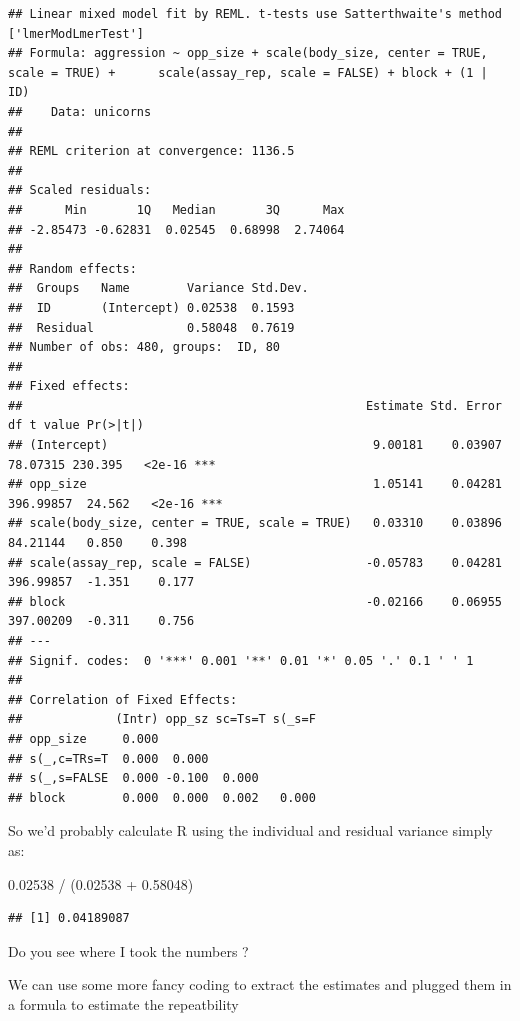 \documentclass[
  12pt,
]{book}
\makeatletter
\newenvironment{Shaded}{\begin{snugshade}}{\end{snugshade}}
\newcommand{\FloatTok}[1]{\textcolor[rgb]{0.00,0.00,0.81}{#1}}
\newcommand{\NormalTok}[1]{#1}
\newcommand{\SpecialCharTok}[1]{\textcolor[rgb]{0.00,0.00,0.00}{#1}}
\newenvironment{kframe}{%
\medskip{}
\setlength{\fboxsep}{.8em}
\def\at@end@of@kframe{}%
\ifinner\ifhmode%
 \def\at@end@of@kframe{\end{minipage}}%
 \begin{minipage}{\columnwidth}%
\fi\fi%
\def\FrameCommand##1{\hskip\@totalleftmargin \hskip-\fboxsep
\colorbox{incolor}{##1}\hskip-\fboxsep
    \hskip-\linewidth \hskip-\@totalleftmargin \hskip\columnwidth}%
\MakeFramed {\advance\hsize-\width
  \@totalleftmargin\z@ \linewidth\hsize
  \@setminipage}}%
{\par\unskip\endMakeFramed%
\at@end@of@kframe}
\newenvironment{rmdblock}[1]
 {
 \begin{itemize}
 \renewcommand{\labelitemi}{
   \raisebox{-.7\height}[0pt][0pt]{
     {\setkeys{Gin}{width=3em,keepaspectratio}\texttt{[image: images/icons/\#1]}}
   }
 }
 \begin{kframe}
 \setlength{\fboxsep}{1em}
 \item
 }
 {
 \end{kframe}
 \end{itemize}
 }
\newenvironment{rmdcode}
  {\begin{rmdblock}{code}}
  {\end{rmdblock}}
\makeatother
\begin{document}
\begin{verbatim}
## Linear mixed model fit by REML. t-tests use Satterthwaite's method ['lmerModLmerTest']
## Formula: aggression ~ opp_size + scale(body_size, center = TRUE, scale = TRUE) +      scale(assay_rep, scale = FALSE) + block + (1 | ID)
##    Data: unicorns
## 
## REML criterion at convergence: 1136.5
## 
## Scaled residuals: 
##      Min       1Q   Median       3Q      Max 
## -2.85473 -0.62831  0.02545  0.68998  2.74064 
## 
## Random effects:
##  Groups   Name        Variance Std.Dev.
##  ID       (Intercept) 0.02538  0.1593  
##  Residual             0.58048  0.7619  
## Number of obs: 480, groups:  ID, 80
## 
## Fixed effects:
##                                                Estimate Std. Error        df t value Pr(>|t|)    
## (Intercept)                                     9.00181    0.03907  78.07315 230.395   <2e-16 ***
## opp_size                                        1.05141    0.04281 396.99857  24.562   <2e-16 ***
## scale(body_size, center = TRUE, scale = TRUE)   0.03310    0.03896  84.21144   0.850    0.398    
## scale(assay_rep, scale = FALSE)                -0.05783    0.04281 396.99857  -1.351    0.177    
## block                                          -0.02166    0.06955 397.00209  -0.311    0.756    
## ---
## Signif. codes:  0 '***' 0.001 '**' 0.01 '*' 0.05 '.' 0.1 ' ' 1
## 
## Correlation of Fixed Effects:
##             (Intr) opp_sz sc=Ts=T s(_s=F
## opp_size     0.000                      
## s(_,c=TRs=T  0.000  0.000               
## s(_,s=FALSE  0.000 -0.100  0.000        
## block        0.000  0.000  0.002   0.000
\end{verbatim}

So we'd probably calculate R using the individual and residual variance simply as:

\begin{Shaded}
\begin{Highlighting}[]
\FloatTok{0.02538} \SpecialCharTok{/}\NormalTok{ (}\FloatTok{0.02538} \SpecialCharTok{+} \FloatTok{0.58048}\NormalTok{)}
\end{Highlighting}
\end{Shaded}

\begin{verbatim}
## [1] 0.04189087
\end{verbatim}

\begin{rmdcode}
Do you see where I took the numbers ?
\end{rmdcode}

We can use some more fancy coding to extract the estimates and plugged them in a formula to estimate the repeatbility
\end{document}
